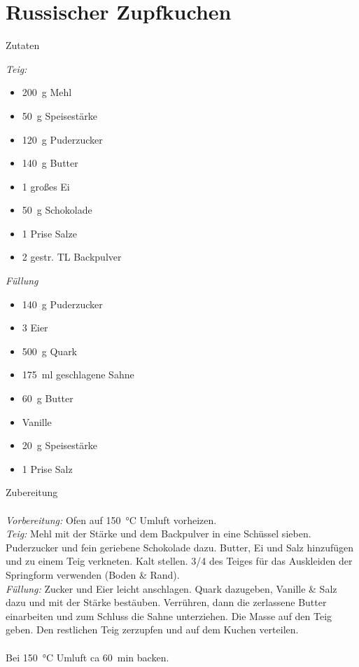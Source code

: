 \section*{Russischer Zupfkuchen}
\ihead{}\ohead{}
\cfoot{}
{\Large Zutaten}
\begin{multicols}{2}
\textit{Teig:}
\begin{itemize}
    \item \SI{200}{g} Mehl
    \item \SI{50}{g} Speisestärke
    \item \SI{120}{g} Puderzucker
    \item \SI{140}{g} Butter
    \item \num{1} großes Ei
    \item \SI{50}{g} Schokolade
    \item \num{1} Prise Salze
    \item \num{2} gestr. TL Backpulver
\end{itemize}
\textit{Füllung}
\begin{itemize}
    \item \SI{140}{g} Puderzucker
    \item \num{3} Eier
    \item \SI{500}{g} Quark
    \item \SI{175}{ml} geschlagene Sahne
    \item \SI{60}{g} Butter
    \item Vanille
    \item \SI{20}{g} Speisestärke
    \item \num{1} Prise Salz
\end{itemize}
\end{multicols}
\noindent
{\Large Zubereitung}\\
\\
\textit{Vorbereitung:} Ofen auf \SI{150}{\celsius} Umluft vorheizen.\\
\textit{Teig:} Mehl mit der Stärke und dem Backpulver in eine Schüssel sieben.
Puderzucker und fein geriebene Schokolade dazu. 
Butter, Ei und Salz hinzufügen und zu einem Teig verkneten. 
Kalt stellen.
\num{3/4} des Teiges für das Auskleiden der Springform verwenden (Boden \& Rand).\\
\textit{Füllung:} Zucker und Eier leicht anschlagen. 
Quark dazugeben, Vanille \& Salz dazu und mit der Stärke bestäuben.
Verrühren, dann die zerlassene Butter einarbeiten und zum Schluss die Sahne unterziehen.
Die Masse auf den Teig geben.
Den restlichen Teig zerzupfen und auf dem Kuchen verteilen.\\
\\
Bei \SI{150}{\celsius} Umluft ca \SI{60}{min} backen.